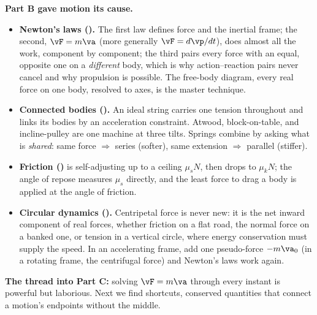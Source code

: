\textbf{Part B gave motion its cause.}
\begin{itemize}
\item \textbf{Newton's laws ().} The first law defines force and the inertial frame; the second,
$\vF=m\va$ (more generally $\vF=d\vp/dt$), does almost all the work, component by component; the third pairs every
force with an equal, opposite one on a \emph{different} body, which is why action--reaction pairs never
cancel and why propulsion is possible. The free-body diagram, every real force on one body, resolved to
axes, is the master technique.
\item \textbf{Connected bodies ().} An ideal string carries one tension throughout and links its
bodies by an acceleration constraint. Atwood, block-on-table, and incline-pulley are one machine at three
tilts. Springs combine by asking what is \emph{shared}: same force $\Rightarrow$ series (softer), same
extension $\Rightarrow$ parallel (stiffer).
\item \textbf{Friction ()} is self-adjusting up to a ceiling $\mu_s N$, then drops to $\mu_k N$; the
angle of repose measures $\mu_s$ directly, and the least force to drag a body is applied at the angle of
friction.
\item \textbf{Circular dynamics ().} Centripetal force is never new: it is the net inward
component of real forces, whether friction on a flat road, the normal force on a banked one, or tension
in a vertical circle, where energy conservation must supply the speed. In an accelerating frame, add one
pseudo-force $-m\va_0$ (in a rotating frame, the centrifugal force) and Newton's laws work again.
\end{itemize}
\textbf{The thread into Part C:} solving $\vF=m\va$ through every instant is powerful but laborious. Next
we find shortcuts, conserved quantities that connect a motion's endpoints without the middle.
